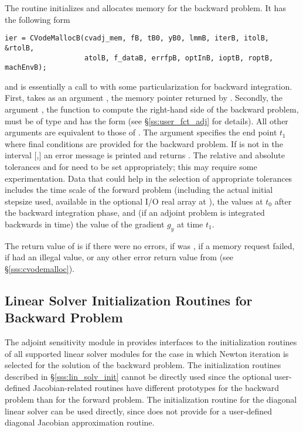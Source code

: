 The routine  initializes and allocates memory for the backward
problem. It has the following form
\begin{verbatim}
ier = CVodeMallocB(cvadj_mem, fB, tB0, yB0, lmmB, iterB, itolB, &rtolB, 
                   atolB, f_dataB, errfpB, optInB, ioptB, roptB, machEnvB);
\end{verbatim}
and is essentially a call to  with some particularization for 
backward integration. First,  takes as an argument 
, the memory pointer returned by .
Secondly, the argument , the {\C} function to compute the right-hand side 
of the backward problem, must be of type  and
has the form  
(see \S\ref{ss:user_fct_adj} for details). 
All other arguments are equivalent to those of . The argument
 specifies the end point $t_1$ where final conditions are provided for
the backward problem. If  is not in the interval $[$,$]$
an error message is printed and  returns .
The relative and absolute tolerances  and  for  need
to be set appropriately; this may require some experimentation. Data that could
help in the selection of appropriate tolerances includes the time scale of the
forward problem (including the actual initial stepsize used, available in the
optional I/O real array at ), the  values at $t_0$ after
the backward integration phase, and (if an adjoint problem is integrated 
backwards in time) the value of the gradient $g_y$ at time $t_1$.

The return value of  is  if there were no errors,
 if  was , 
if a memory request failed,  if  had an illegal value,
or any other error return value from  (see \S\ref{sss:cvodemalloc}).

\subsection{Linear Solver Initialization Routines for Backward Problem}\label{sss:lin_solv_b}

The adjoint sensitivity module in {\cvodes} provides interfaces to the initialization
routines of all supported linear solver modules for the case in which Newton
iteration is selected for the solution of the backward problem. The initialization
routines described in \S\ref{sss:lin_solv_init} cannot be directly used since the
optional user-defined Jacobian-related routines have different prototypes for the
backward problem than for the forward problem. The initialization routine
 for the diagonal linear solver can be used directly, since {\cvdiag}
does not provide for a user-defined diagonal Jacobian approximation routine. 

